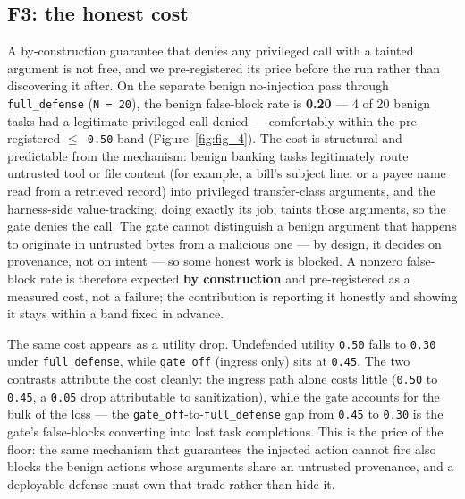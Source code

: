 \documentclass[sigconf,anonymous,review]{acmart}
\begin{document}
\subsection{F3: the honest cost}
A by-construction guarantee that denies any privileged call with a tainted argument is not free, and we pre-registered its price before the run rather than discovering it after. On the separate benign no-injection pass through \texttt{full\_defense} (\texttt{N = 20}), the benign false-block rate is \textbf{0.20} --- 4 of 20 benign tasks had a legitimate privileged call denied --- comfortably within the pre-registered \texttt{$\leq$ 0.50} band (Figure~\ref{fig:fig_4}). The cost is structural and predictable from the mechanism: benign banking tasks legitimately route untrusted tool or file content (for example, a bill's subject line, or a payee name read from a retrieved record) into privileged transfer-class arguments, and the harness-side value-tracking, doing exactly its job, taints those arguments, so the gate denies the call. The gate cannot distinguish a benign argument that happens to originate in untrusted bytes from a malicious one --- by design, it decides on provenance, not on intent --- so some honest work is blocked. A nonzero false-block rate is therefore expected \textbf{by construction} and pre-registered as a measured cost, not a failure; the contribution is reporting it honestly and showing it stays within a band fixed in advance.

The same cost appears as a utility drop. Undefended utility \texttt{0.50} falls to \texttt{0.30} under \texttt{full\_defense}, while \texttt{gate\_off} (ingress only) sits at \texttt{0.45}. The two contrasts attribute the cost cleanly: the ingress path alone costs little (\texttt{0.50} to \texttt{0.45}, a \texttt{0.05} drop attributable to sanitization), while the gate accounts for the bulk of the loss --- the \texttt{gate\_off}-to-\texttt{full\_defense} gap from \texttt{0.45} to \texttt{0.30} is the gate's false-blocks converting into lost task completions. This is the price of the floor: the same mechanism that guarantees the injected action cannot fire also blocks the benign actions whose arguments share an untrusted provenance, and a deployable defense must own that trade rather than hide it.
\end{document}
